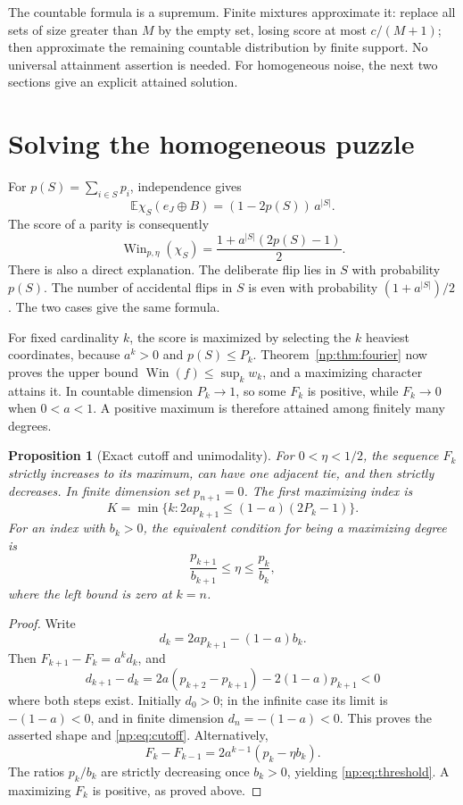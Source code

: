 \documentclass[11pt,a4paper]{article}
\newtheorem{proposition}[theorem]{Proposition}
\theoremstyle{definition}
\theoremstyle{remark}
\newcommand{\E}{\mathbb E}
\newcommand{\Win}{\operatorname{Win}}
\begin{document}
The countable formula is a supremum. Finite mixtures approximate it:
replace all sets of size greater than \(M\) by the empty set, losing score
at most \(c/(M+1)\); then approximate the remaining countable distribution
by finite support. No universal attainment assertion is needed.
For homogeneous noise, the next two sections give an explicit attained
solution.

\section{Solving the homogeneous puzzle}\label{np:sec:exact}

For \(p(S)=\sum_{i\in S}p_i\), independence gives
\begin{equation}\label{np:eq:eigenvalue}
 \E\chi_S(e_J\oplus B)
 =(1-2p(S))\,a^{|S|}.
\end{equation}
The score of a parity is consequently
\[
 \Win_{p,\eta}(\chi_S)=
 \frac{1+a^{|S|}(2p(S)-1)}2.
\]
There is also a direct explanation. The deliberate flip lies in \(S\)
with probability \(p(S)\). The number of accidental flips in \(S\) is
even with probability \((1+a^{|S|})/2\). The two cases give the same formula.

For fixed cardinality \(k\), the score is maximized by selecting the
\(k\) heaviest coordinates, because \(a^k>0\) and
\(p(S)\le P_k\). Theorem~\ref{np:thm:fourier} now proves the upper bound
\(\Win(f)\le\sup_k w_k\), and a maximizing character attains it.
In countable dimension \(P_k\to1\), so some \(F_k\) is positive, while
\(F_k\to0\) when \(0<a<1\). A positive maximum is therefore attained
among finitely many degrees.

\begin{proposition}[Exact cutoff and unimodality]\label{np:prop:cutoff}
For \(0<\eta<1/2\), the sequence \(F_k\) strictly increases to its maximum,
can have one adjacent tie, and then strictly decreases. In finite dimension
set \(p_{n+1}=0\). The first maximizing index is
\begin{equation}\label{np:eq:cutoff}
 K=\min\{k:2a p_{k+1}\le(1-a)(2P_k-1)\}.
\end{equation}
For an index with \(b_k>0\), the equivalent condition for being a
maximizing degree is
\begin{equation}\label{np:eq:threshold}
 \frac{p_{k+1}}{b_{k+1}}\le\eta\le\frac{p_k}{b_k},
\end{equation}
where the left bound is zero at \(k=n\).
\end{proposition}
\begin{proof}
Write
\[
 d_k=2a p_{k+1}-(1-a)b_k.
\]
Then \(F_{k+1}-F_k=a^kd_k\), and
\[
 d_{k+1}-d_k
 =2a(p_{k+2}-p_{k+1})-2(1-a)p_{k+1}<0
\]
where both steps exist. Initially \(d_0>0\); in the infinite case its
limit is \(-(1-a)<0\), and in finite dimension \(d_n=-(1-a)<0\).
This proves the asserted shape and \eqref{np:eq:cutoff}.
Alternatively,
\[
 F_k-F_{k-1}=2a^{k-1}(p_k-\eta b_k).
\]
The ratios \(p_k/b_k\) are strictly decreasing once \(b_k>0\), yielding
\eqref{np:eq:threshold}. A maximizing \(F_k\) is positive, as proved above.
\end{proof}
\end{document}
